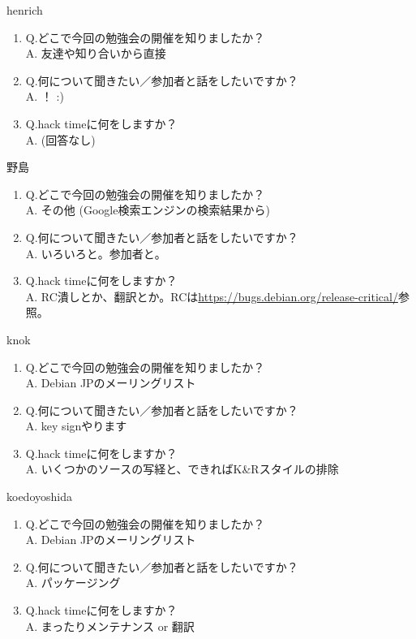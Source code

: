 \begin{prework}{ henrich }
  \begin{enumerate}
  \item Q.どこで今回の勉強会の開催を知りましたか？\\
    A. 友達や知り合いから直接
  \item Q.何について聞きたい／参加者と話をしたいですか？\\
    A. ！ :)
  \item Q.hack timeに何をしますか？\\
    A. (回答なし)
  \end{enumerate}
\end{prework}

\begin{prework}{ 野島 }
  \begin{enumerate}
  \item Q.どこで今回の勉強会の開催を知りましたか？\\
    A. その他 (Google検索エンジンの検索結果から)
  \item Q.何について聞きたい／参加者と話をしたいですか？\\
    A. いろいろと。参加者と。
  \item Q.hack timeに何をしますか？\\
    A. RC潰しとか、翻訳とか。RCは\url{https://bugs.debian.org/release-critical/}参照。
  \end{enumerate}
\end{prework}

\begin{prework}{ knok }
  \begin{enumerate}
  \item Q.どこで今回の勉強会の開催を知りましたか？\\
    A. Debian JPのメーリングリスト
  \item Q.何について聞きたい／参加者と話をしたいですか？\\
    A. key signやります
  \item Q.hack timeに何をしますか？\\
    A. いくつかのソースの写経と、できればK\&Rスタイルの排除
  \end{enumerate}
\end{prework}

\begin{prework}{ koedoyoshida }
  \begin{enumerate}
  \item Q.どこで今回の勉強会の開催を知りましたか？\\
    A. Debian JPのメーリングリスト
  \item Q.何について聞きたい／参加者と話をしたいですか？\\
    A. パッケージング
  \item Q.hack timeに何をしますか？\\
    A. まったりメンテナンス or 翻訳
  \end{enumerate}
\end{prework}


